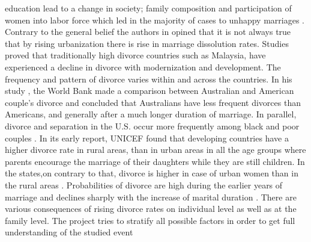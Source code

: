 \documentclass[10pt,twocolumn]{article}
\begin{document}
education lead to a change in society; family composition and participation of women into labor force which led in the majority of cases to unhappy marriages \cite{laland2006niche}. Contrary to the general belief the authors in \cite{hirschman2003cultural} opined that it is not always true that by rising urbanization there is rise in marriage dissolution rates. Studies proved that traditionally high divorce countries such as  Malaysia, have experienced a decline in divorce with modernization and development. The frequency and pattern of divorce varies within and across the countries. In his study \cite{hammer2006scenes}, the World Bank made a comparison between Australian and American couple’s divorce and concluded that Australians have less frequent divorces than Americans, and generally after a much longer duration of marriage. In parallel, divorce and separation in the U.S. occur more frequently among black and poor couples \cite{kennedy2014breaking}. In its early report, UNICEF \cite{unicef2005early} found that developing countries have a higher divorce rate in rural areas, than in urban areas in all the age groups where parents encourage the marriage of their daughters while they are still children. In the states,on contrary to that, divorce is higher in case of urban women than in the rural areas \cite{rennison2000intimate}. Probabilities of divorce are high during the earlier years of marriage and declines sharply with the increase of marital duration \cite{vanlaningham2001marital}. There are various consequences of rising divorce rates on individual level as well as at the family level. The project tries to stratify all possible factors in order to get full understanding of the studied event
\end{document}
